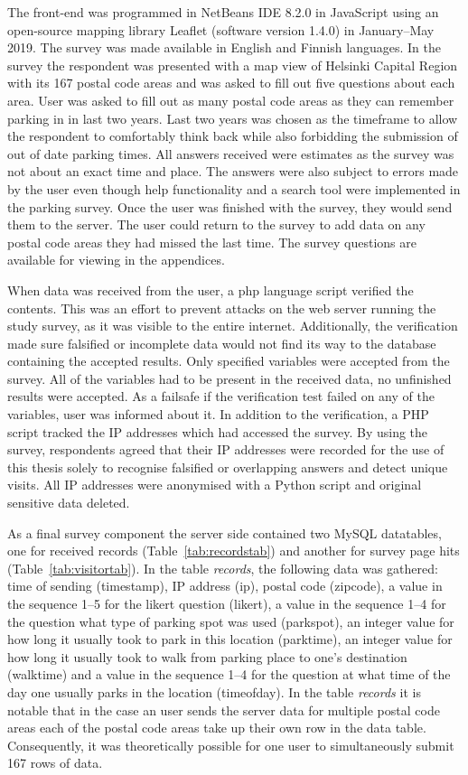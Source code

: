 The front-end was programmed in NetBeans IDE 8.2.0 in JavaScript using an open-source mapping library Leaflet (software version 1.4.0) in January--May 2019. The survey was made available in English and Finnish languages. In the survey the respondent was presented with a map view of Helsinki Capital Region with its 167 postal code areas and was asked to fill out five questions about each area. User was asked to fill out as many postal code areas as they can remember parking in in last two years. Last two years was chosen as the timeframe to allow the respondent to comfortably think back while also forbidding the submission of out of date parking times. All answers received were estimates as the survey was not about an exact time and place. The answers were also subject to errors made by the user even though help functionality and a search tool were implemented in the parking survey. Once the user was finished with the survey, they would send them to the server. The user could return to the survey to add data on any postal code areas they had missed the last time. The survey questions are available for viewing in the appendices.

When data was received from the user, a \gls{php} language script verified the contents. This was an effort to prevent attacks on the web server running the study survey, as it was visible to the entire internet. Additionally, the verification made sure falsified or incomplete data would not find its way to the database containing the accepted results. Only specified variables were accepted from the survey. All of the variables had to be present in the received data, no unfinished results were accepted. As a failsafe if the verification test failed on any of the variables, user was informed about it. In addition to the verification, a PHP script tracked the IP addresses which had accessed the survey. By using the survey, respondents agreed that their IP addresses were recorded for the use of this thesis solely to recognise falsified or overlapping answers and detect unique visits. All IP addresses were anonymised with a Python script and original sensitive data deleted.

As a final survey component the server side contained two MySQL datatables, one for received records (Table~\ref{tab:recordstab}) and another for survey page hits (Table~\ref{tab:visitortab}). In the table \textit{records}, the following data was gathered: time of sending (timestamp), IP address (ip), postal code (zipcode), a value in the sequence 1--5 for the likert question (likert), a value in the sequence 1--4 for the question what type of parking spot was used (parkspot), an integer value for how long it usually took to park in this location (parktime), an integer value for how long it usually took to walk from parking place to one's destination (walktime) and a value in the sequence 1--4 for the question at what time of the day one usually parks in the location (timeofday). In the table \textit{records} it is notable that in the case an user sends the server data for multiple postal code areas each of the postal code areas take up their own row in the data table. Consequently, it was theoretically possible for one user to simultaneously submit 167 rows of data.

